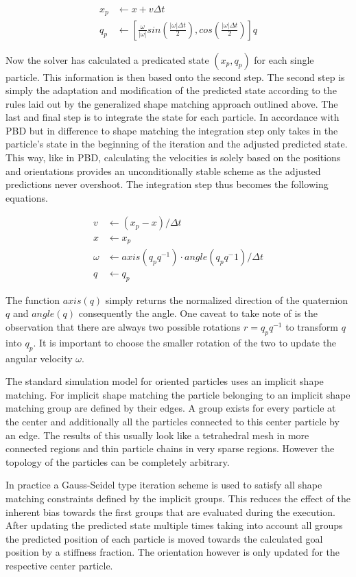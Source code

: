 \begin{align}
x_p &\leftarrow x + v\Delta t \\
q_p &\leftarrow [\frac{\omega}{|\omega|}sin(\frac{|\omega|\Delta t}{2}), cos(\frac{|\omega|\Delta t}{2})]q
\end{align}

Now the solver has calculated a predicated state $(x_p,q_p)$ for each single particle. This information is then based onto the second step. The second step is simply the adaptation and modification of the predicted state according to the rules laid out by the generalized shape matching approach outlined above. The last and final step is to integrate the state for each particle. In accordance with PBD but in difference to shape matching the integration step only takes in the particle's state in the beginning of the iteration and the adjusted predicted state. This way, like in PBD, calculating the velocities is solely based on the positions and orientations provides an unconditionally stable scheme as the adjusted predictions never overshoot. The integration step thus becomes the following equations.

\begin{align}
v &\leftarrow (x_p - x)/\Delta t \\
x &\leftarrow x_p \\
\omega &\leftarrow axis(q_p q^{-1}) \cdot angle(q_p q^-1)/\Delta t \\
q &\leftarrow q_p
\end{align}

The function $axis(q)$ simply returns the normalized direction of the quaternion $q$ and $angle(q)$ consequently the angle. One caveat to take note of is the observation that there are always two possible rotations $r=q_pq^{-1}$ to transform $q$ into $q_p$. It is important to choose the smaller rotation of the two to update the angular velocity $\omega$.

The standard simulation model for oriented particles uses an implicit shape matching. For implicit shape matching the particle belonging to an implicit shape matching group are defined by their edges. A group exists for every particle at the center and additionally all the particles connected to this center particle by an edge. The results of this usually look like a tetrahedral mesh in more connected regions and thin particle chains in very sparse regions. However the topology of the particles can be completely arbitrary.

In practice a Gauss-Seidel type iteration scheme is used to satisfy all shape matching constraints defined by the implicit groups. This reduces the effect of the inherent bias towards the first groups that are evaluated during the execution. After updating the predicted state multiple times taking into account all groups the predicted position of each particle is moved towards the calculated goal position by a stiffness fraction. The orientation however is only updated for the respective center particle.

